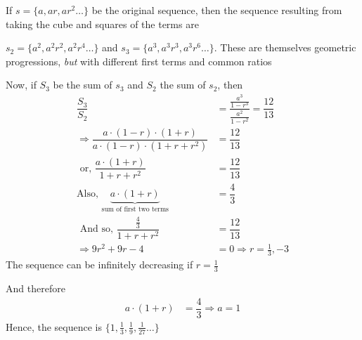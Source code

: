 \begin{solution}
   If $s = \lbrace a, ar, ar^2 \ldots\rbrace$ be the original sequence, then the sequence
   resulting from taking the cube and squares of the terms are
   
   $s_2 = \lbrace a^2, a^2r^2,a^2r^4 \ldots \rbrace$ and $ s_3 = \lbrace a^3, a^3r^3, a^3r^6 \ldots \rbrace$.
   These are themselves geometric progressions, \textit{but} with different first terms and common ratios
   
   Now, if $S_3$ be the sum of $s_3$ and $S_2$ the sum of $s_2$, then
   \begin{align}
   		\dfrac{S_3}{S_2} &= \dfrac{\frac{a^3}{1-r^3}}{\frac{a^2}{1-r^2}} = \dfrac{12}{13} \\
   		\Rightarrow \dfrac{a\cdot(1-r)\cdot(1+r)}{a\cdot(1-r)\cdot(1+r+r^2)} &= \dfrac{12}{13} \\
   		\text{ or, } \dfrac{a\cdot(1+r)}{1+r+r^2} &= \dfrac{12}{13} \\
   		\text{Also, } \underbrace{a\cdot(1+r)}_{\text{sum of first two terms}} &= \dfrac{4}{3} \\
   		\text{ And so, } \dfrac{\frac{4}{3}}{1+r+r^2} &= \dfrac{12}{13} \\
   		\Rightarrow 9r^2 + 9r - 4 &= 0 \Rightarrow r = \frac{1}{3}, -3
   \end{align}
   The sequence can be infinitely decreasing if $r = \frac{1}{3}$
   
   And therefore 
   \begin{align}
   	a\cdot(1+r) &= \dfrac{4}{3} \Rightarrow a = 1
   \end{align}
   Hence, the sequence is $\lbrace 1, \frac{1}{3}, \frac{1}{9}, \frac{1}{27} \ldots\rbrace$
\end{solution}
